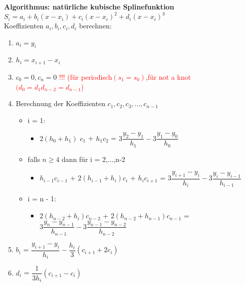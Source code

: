 \documentclass[../ZF_HM2.tex]{subfiles}
\begin{document}
\begin{mdframed}
	\textbf{Algorithmus: natürliche kubische Splinefunktion\\}
	$S_i = a_i + b_i(x-x_i) + c_i(x-x_i)^{2} + d_i(x-x_i)^{3}$\\
Koeffizienten $a_i,b_i,c_i,d_i$ berechnen:
\begin{enumerate}
	\item $a_i = y_i$
	\item $h_i = x_{i+1}-x_i$
	\item $c_0 = 0, c_n=0$ \textcolor{red}{!!! (für periodisch$(s_1 = s_0)$,für not a knot$(d_0 = d_1 d_{n-2} = d_{n-1}$)}
	\item Berechnung der Koeffizienten $c_1,c_2,c_3,...,c_{n-1}$
	\begin{itemize}
		\item \colorbox {green!30} {i = 1:}
		\begin{itemize}
			\item \colorbox{yellow!30}{$2(h_0 + h_1)$} \colorbox {violet!30}{$c_1$} + \colorbox{yellow!30}{$h_1$}\colorbox {violet!30}{$c_2$} = \colorbox{orange!30}{$3\dfrac{y_2-y_1}{h_1}-3\dfrac{y_1-y_0}{h_0}$}
		\end{itemize}
		\item falls \colorbox {green!30} {$n \geq 4$} dann für i = 2,...,n-2
		\begin{itemize}
			\item \colorbox{yellow!30}{$h_{i-1}$}\colorbox {violet!30}{$c_{i-1}$} + \colorbox{yellow!30}{$2(h_{i-1} + h_i)$}\colorbox {violet!30}{$c_{i}$} + \colorbox{yellow!30}{$h_i$}\colorbox {violet!30}{$c_{i+1}$} = \colorbox{orange!30}{$3\dfrac{y_{i+1}-y_i}{h_i}-3\dfrac{y_i-y_{i-1}}{h_{i-1}}$}
		\end{itemize}
		\item \colorbox {green!30} {i = n - 1:}
		\begin{itemize}
			\item \colorbox{yellow!30}{$2(h_{n-2} + h_i)$}\colorbox {violet!30}{$c_{n-2}$} + \colorbox{yellow!30}{$2(h_{n-2} + h_{n-1})$}\colorbox {violet!30}{$c_{n-1}$} = \colorbox{orange!30}{$3\dfrac{y_{n}-y_{n-1}}{h_{n-1}}-3\dfrac{y_{n-1}-y_{n-2}}{h_{n-2}}$}
		\end{itemize}
		
	\end{itemize}
	\item $b_i$ = $\dfrac{y_{i+1}-y_{i}}{h_{i}}-\dfrac{h_{i}}{3}(c_{i+1}+2c_i)$
	\item $d_i$ = $\dfrac{1}{3h_i}(c_{i+1}-c_i)$
\end{enumerate}
	
\end{mdframed}
\end{document}
